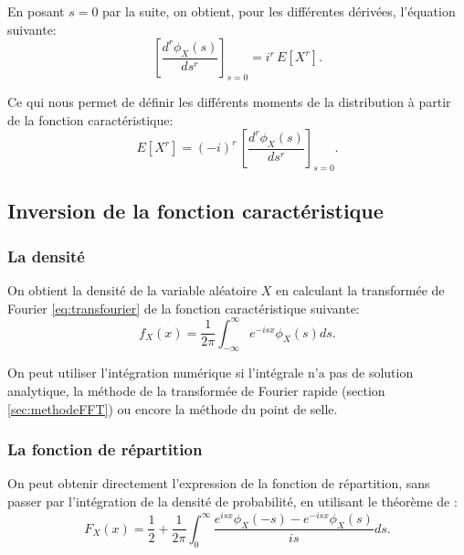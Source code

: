 En posant $s=0$ par la suite, on obtient, pour les différentes
dérivées, l'équation suivante:
\begin{equation*}
  \left[ \frac{d^r\phi_X(s)}{ds^r} \right]_{s=0} = i^r\,E[X^r].
\end{equation*}

Ce qui nous permet de définir les différents moments de la
distribution à partir de la fonction caractéristique:
\begin{equation}
  \label{eq:fncaractmoments}
  E[X^r] = (-i)^r\,\left[ \frac{d^r\phi_X(s)}{ds^r} \right]_{s=0}. 
\end{equation}

\subsection{Inversion de la fonction caractéristique}
\label{sec:inversioncaract}

\subsubsection{La densité}
\label{sec:densitefncaract}

On obtient la densité de la variable aléatoire $X$ en calculant la
transformée de Fourier \eqref{eq:transfourier} de la fonction
caractéristique suivante:
\begin{equation}
  \label{eq:caractdensite}
  f_X(x) = \frac{1}{2\pi} \int_{-\infty}^{\infty} e^{-isx} \phi_X(s) ds.
\end{equation}

On peut utiliser l'intégration numérique si l'intégrale n'a pas de
solution analytique, la méthode de la transformée de Fourier rapide
(section \ref{sec:methodeFFT}) ou encore la méthode du point de selle.

\subsubsection{La fonction de répartition}
\label{sec:repartitionfncaract}

On peut obtenir directement l'expression de la fonction de
répartition, sans passer par l'intégration de la densité de
probabilité, en utilisant le théorème de \cite{gil1951note}:
\begin{equation}
  \label{eq:gilpelaez}
  F_X(x) = \frac{1}{2} + \frac{1}{2\pi} \int_{0}^{\infty} \frac{e^{isx}\phi_X(-s)-e^{-isx}\phi_X(s)}{is} ds.
\end{equation}

